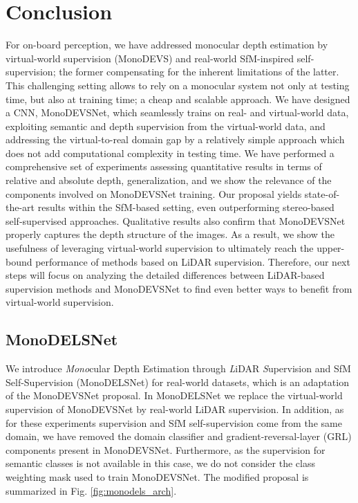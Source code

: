 \documentclass[journal]{IEEEtran}
\newcommand{\Fig}[1]{Fig. \ref{fig:#1}}
\begin{document}
\section{Conclusion}
\label{sec:conclusion}
For on-board perception, we have addressed monocular depth estimation by virtual-world supervision (MonoDEVS) and real-world SfM-inspired self-supervision; the former compensating for the inherent limitations of the latter. This challenging setting allows to rely on a monocular system not only at testing time, but also at training time; a cheap and scalable approach. We have designed a CNN, MonoDEVSNet, which seamlessly trains on real- and virtual-world data, exploiting semantic and depth supervision from the virtual-world data, and addressing the virtual-to-real domain gap by a relatively simple approach which does not add computational complexity in testing time. We have performed a comprehensive set of experiments assessing quantitative results in terms of relative and absolute depth, generalization, and we show the relevance of the components involved on MonoDEVSNet training. Our proposal yields state-of-the-art results within the SfM-based setting, even outperforming stereo-based self-supervised approaches. Qualitative results also confirm that MonoDEVSNet properly captures the depth structure of the images. As a result, we show the usefulness of leveraging virtual-world supervision to ultimately reach the upper-bound performance of methods based on LiDAR supervision. Therefore, our next steps will focus on analyzing the detailed differences between LiDAR-based supervision methods and MonoDEVSNet to find even better ways to benefit from virtual-world supervision.  

\appendix

\subsection{MonoDELSNet}
\label{appsec:monodelsnet}

We introduce \emph{Mono}cular Depth Estimation through \emph{L}iDAR \emph{S}upervision and SfM Self-Supervision (MonoDELSNet) for real-world datasets, which is an adaptation of the MonoDEVSNet proposal. In MonoDELSNet we replace the virtual-world supervision of MonoDEVSNet by real-world LiDAR supervision. In addition, as for these experiments supervision and SfM self-supervision come from the same domain, we have removed the domain classifier and gradient-reversal-layer (GRL) components present in MonoDEVSNet. Furthermore, as the supervision for semantic classes is not available in this case, we do not consider the class weighting mask used to train MonoDEVSNet. The modified proposal is summarized in \Fig{monodels_arch}.
\end{document}
